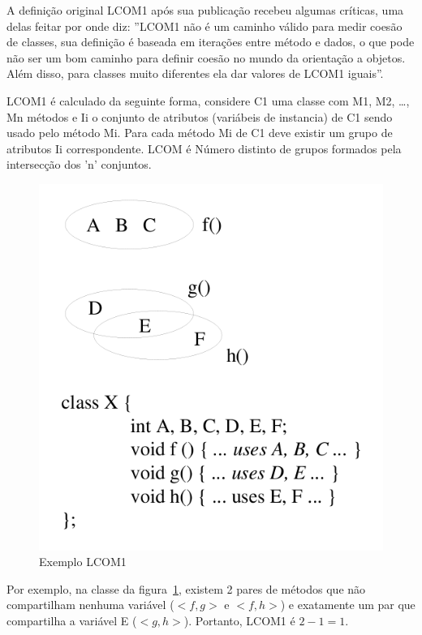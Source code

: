 A definição original LCOM1 após sua publicação recebeu algumas críticas, uma
delas feitar por  onde diz: ''LCOM1 não é
um caminho válido para medir coesão de classes, sua definição é baseada em
iterações entre método e dados, o que pode não ser um bom caminho para definir
coesão no mundo da orientação a objetos. Além disso, para classes muito
diferentes ela dar valores de LCOM1 iguais''.

LCOM1 é calculado da seguinte forma, considere C1 uma classe com M1, M2,
\ldots, Mn métodos e Ii o conjunto de atributos (variábeis de instancia) de C1
sendo usado pelo método Mi. Para cada método Mi de C1 deve existir um grupo de
atributos Ii correspondente. LCOM é Número distinto de grupos formados pela
intersecção dos 'n' conjuntos.

\begin{figure}[h]
\center
\includegraphics[scale=0.4]{imagens/exemplo-lcom1-hitz-e-montazeri}
\caption{Exemplo LCOM1 \cite{measuringCouplingAndCohesion}}
\label{fig:exemplo-lcom1}
\end{figure}

Por exemplo, na classe da figura~\ref{fig:exemplo-lcom1}, existem 2 pares de
métodos que não compartilham nenhuma variável ($<f, g>$ e $<f, h>$) e
exatamente um par que compartilha a variável E ($<g, h>$). Portanto, LCOM1 é $2
- 1 = 1$.

